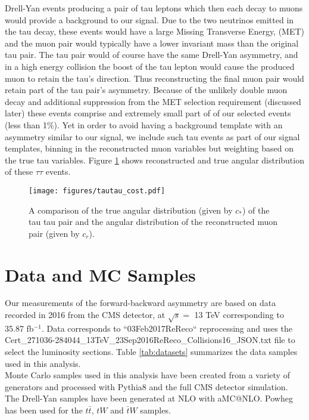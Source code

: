 \documentclass[
    10pt, %
    a4paper, %
    oneside, %
    headinclude,footinclude, %
    BCOR5mm, %
]{scrartcl}
\begin{document}
Drell-Yan events producing a pair of tau leptons which then each decay to muons would provide a background 
to our signal. Due to the two neutrinos emitted in the tau decay, these events would have a large Missing Transverse Energy,
(MET) and the muon pair would typically have a lower invariant mass than the original tau pair. The tau pair would of course have the
same Drell-Yan asymmetry, and in a high energy collision the boost of the tau lepton would cause the produced muon to retain the tau's direction.
Thus reconstructing the final muon pair would retain part of the tau pair's asymmetry. Because of the unlikely double muon decay and
additional suppression from the MET selection requirement (discussed later) these events comprise and extremely small part of of our 
selected events (less than 1\%).  
Yet in order to avoid having a background template with an asymmetry similar to our signal, we include such tau events as part of our signal
templates, binning in the reconstructed muon variables but weighting based on the true tau variables. Figure \ref{fig:tautau_cost} 
shows reconstructed and true angular distribution of these $\tau\tau$ events.


\begin{figure}[H]
    \texttt{[image: figures/tautau\_cost.pdf]}
    \centering
    \caption{A comparison of the true angular distribution (given by $c_*$) of the tau tau pair
    and the angular distribution of the reconstructed muon pair (given by $c_r$). } 
    \label{fig:tautau_cost}
\end{figure}

\section{Data and MC Samples}

Our measurements of the forward-backward asymmetry are based on data recorded in 2016 from the CMS detector, at $\sqrt{s} =$ 13 TeV
corresponding to 35.87 fb$^{-1}$. Data corresponds to ``03Feb2017ReReco`` reprocessing and uses the
{\small Cert\_271036-284044\_13TeV\_23Sep2016ReReco\_Collisions16\_JSON.txt} file to select the luminosity sections.
Table \ref{tab:datasets} summarizes the data samples used in this analysis.\\

Monte Carlo samples used in this analysis have been created from a variety of generators and processed with Pythia8 and the full CMS detector simulation.
The Drell-Yan samples have been generated at NLO with aMC@NLO. Powheg has been used for the $t \bar{t}$, $tW$ and $\bar{t}W$ samples. 
\end{document}
